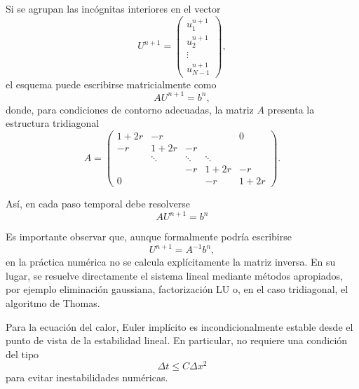 \documentclass[12pt]{article}
\begin{document}
Si se agrupan las incógnitas interiores en el vector
\begin{equation}
    U^{n+1}
    =
    \begin{pmatrix}
        u_1^{n+1}\\
        u_2^{n+1}\\
        \vdots\\
        u_{N-1}^{n+1}
    \end{pmatrix},
\end{equation}
el esquema puede escribirse matricialmente como
\begin{equation}
    A U^{n+1}
    =
    b^n,
\end{equation}
donde, para condiciones de contorno adecuadas, la matriz $A$ presenta la estructura tridiagonal
\begin{equation}
    A
    =
    \begin{pmatrix}
        1+2r & -r     &        &        & 0\\
        -r   & 1+2r   & -r     &        & \\
             & \ddots & \ddots & \ddots & \\
             &        & -r     & 1+2r   & -r\\
        0    &        &        & -r     & 1+2r
    \end{pmatrix}.
\end{equation}

Así, en cada paso temporal debe resolverse
\begin{equation}
    \boxed{
    A U^{n+1}
    =
    b^n
    }
\end{equation}

Es importante observar que, aunque formalmente podría escribirse
\begin{equation}
    U^{n+1}
    =
    A^{-1}b^n,
\end{equation}
en la práctica numérica no se calcula explícitamente la matriz inversa. En su lugar, se resuelve directamente el sistema lineal mediante métodos apropiados, por ejemplo eliminación gaussiana, factorización LU o, en el caso tridiagonal, el algoritmo de Thomas.

Para la ecuación del calor, Euler implícito es incondicionalmente estable desde el punto de vista de la estabilidad lineal. En particular, no requiere una condición del tipo
\begin{equation}
    \Delta t
    \leq
    C\Delta x^2
\end{equation}
para evitar inestabilidades numéricas.
\end{document}
